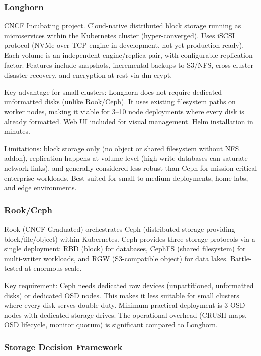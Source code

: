 \documentclass[11pt,letterpaper]{article}
\begin{document}
\subsubsection{Longhorn}
CNCF Incubating project. Cloud-native distributed block storage running as microservices within the Kubernetes cluster (hyper-converged). Uses iSCSI protocol (NVMe-over-TCP engine in development, not yet production-ready). Each volume is an independent engine/replica pair, with configurable replication factor. Features include snapshots, incremental backups to S3/NFS, cross-cluster disaster recovery, and encryption at rest via dm-crypt.

Key advantage for small clusters: Longhorn does not require dedicated unformatted disks (unlike Rook/Ceph). It uses existing filesystem paths on worker nodes, making it viable for 3--10 node deployments where every disk is already formatted. Web UI included for visual management. Helm installation in minutes.

Limitations: block storage only (no object or shared filesystem without NFS addon), replication happens at volume level (high-write databases can saturate network links), and generally considered less robust than Ceph for mission-critical enterprise workloads. Best suited for small-to-medium deployments, home labs, and edge environments.

\subsubsection{Rook/Ceph}
Rook (CNCF Graduated) orchestrates Ceph (distributed storage providing block/file/object) within Kubernetes. Ceph provides three storage protocols via a single deployment: RBD (block) for databases, CephFS (shared filesystem) for multi-writer workloads, and RGW (S3-compatible object) for data lakes. Battle-tested at enormous scale.

Key requirement: Ceph needs dedicated raw devices (unpartitioned, unformatted disks) or dedicated OSD nodes. This makes it less suitable for small clusters where every disk serves double duty. Minimum practical deployment is 3 OSD nodes with dedicated storage drives. The operational overhead (CRUSH maps, OSD lifecycle, monitor quorum) is significant compared to Longhorn.

\subsubsection{Storage Decision Framework}
\end{document}
